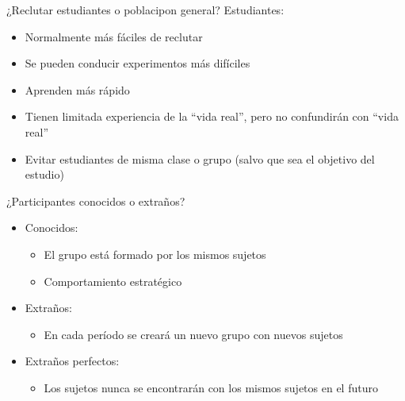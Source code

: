 \documentclass[
  ignorenonframetext,
]{beamer}
\providecommand{\tightlist}{%
  \setlength{\itemsep}{0pt}\setlength{\parskip}{0pt}}
\begin{document}
\begin{frame}{¿Reclutar estudiantes o poblacipon general?}
\protect\hypertarget{reclutar-estudiantes-o-poblacipon-general}{}
Estudiantes:

\begin{itemize}
\item
  Normalmente más fáciles de reclutar
\item
  Se pueden conducir experimentos más difíciles
\item
  Aprenden más rápido
\item
  Tienen limitada experiencia de la ``vida real'', pero no confundirán
  con ``vida real''
\item
  Evitar estudiantes de misma clase o grupo (salvo que sea el objetivo
  del estudio)
\end{itemize}
\end{frame}

\begin{frame}{¿Participantes conocidos o extraños?}
\protect\hypertarget{participantes-conocidos-o-extrauxf1os}{}
\begin{itemize}
\tightlist
\item
  Conocidos:

  \begin{itemize}
  \tightlist
  \item
    El grupo está formado por los mismos sujetos
  \item
    Comportamiento estratégico
  \end{itemize}
\item
  Extraños:

  \begin{itemize}
  \tightlist
  \item
    En cada período se creará un nuevo grupo con nuevos sujetos
  \end{itemize}
\item
  Extraños perfectos:

  \begin{itemize}
  \tightlist
  \item
    Los sujetos nunca se encontrarán con los mismos sujetos en el futuro
  \end{itemize}
\end{itemize}
\end{frame}
\end{document}
